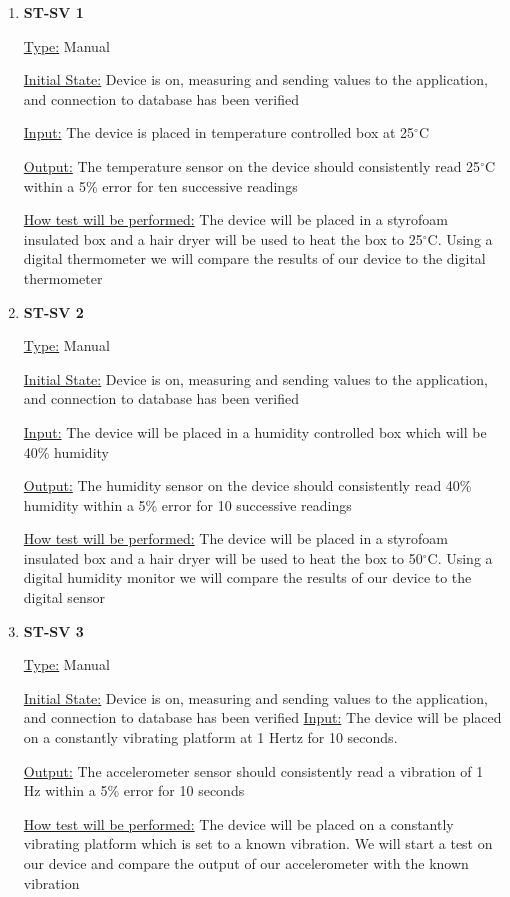 \documentclass[12pt, titlepage]{article}
\begin{document}
\begin{enumerate}

\item{\bf{ST-SV 1}}

\underline{Type:} Manual
					
\underline{Initial State:} Device is on, measuring and sending values to the application, and connection to database has been verified
					
\underline{Input:} The device is placed in temperature controlled box at 25$^{\circ}$C
					
\underline{Output:} The temperature sensor on the device should consistently read 25$^{\circ}$C within a 5\% error for ten successive readings 

					
\underline{How test will be performed:} The device will be placed in a styrofoam insulated box and a hair dryer will be used to heat the box to 25$^{\circ}$C. Using a digital thermometer we will compare the results of our device to the digital thermometer\\

		
\item{\bf{ST-SV 2}}

\underline{Type:} Manual
					
\underline{Initial State:} Device is on, measuring and sending values to the application, and connection to database has been verified
					
\underline{Input:} The device will be placed in a humidity controlled box which will be 40\% humidity
					
\underline{Output:} The humidity sensor on the device should consistently read 40\% humidity within a 5\% error for 10 successive readings

\underline{How test will be performed:} The device will be placed in a styrofoam insulated box and a hair dryer will be used to heat the box to 50$^{\circ}$C. Using a digital humidity monitor we will compare the results of our device to the digital sensor

\newpage
\item{\bf{ST-SV 3}}

\underline{Type:} Manual
					
\underline{Initial State:} Device is on, measuring and sending values to the application, and connection to database has been verified
\underline{Input:} The device will be placed on a constantly vibrating platform at 1 Hertz for 10 seconds.
					
\underline{Output:} The accelerometer sensor should consistently read a vibration of 1 Hz within a 5\% error for 10 seconds

\underline{How test will be performed:} The device will be placed on a constantly vibrating platform which is set to a known vibration. We will start a test on our device and compare the output of our accelerometer with the known vibration

\end{enumerate}
\end{document}
